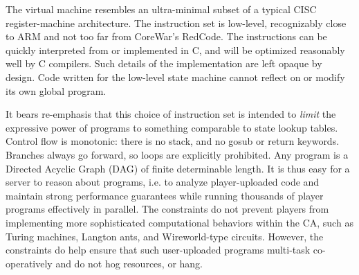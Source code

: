 \documentclass{acm_proc_article-sp}
\begin{document}
The virtual machine resembles an ultra-minimal subset of a typical CISC register-machine architecture.
The instruction set is low-level, recognizably close to ARM\cite{seal00} and not too far from CoreWar's RedCode\cite{CoreWarGuidelines84}.
The instructions can be quickly interpreted from or implemented in C, and will be optimized reasonably well by C compilers.
Such details of the implementation are left opaque by design.
Code written for the low-level state machine cannot reflect on or modify its own global program.
\begin{center}
\end{center}
It bears re-emphasis that this choice of instruction set is intended to {\em limit} the expressive power of programs
to something comparable to state lookup tables.
Control flow is monotonic: there is no stack, and no gosub or return keywords.
Branches always go forward, so loops are explicitly prohibited.
Any program is a Directed Acyclic Graph (DAG) of finite determinable length.
It is thus easy for a server to reason about programs,
i.e. to analyze player-uploaded code and maintain strong performance guarantees
while running thousands of player programs effectively in parallel.
The constraints do not prevent players from implementing
more sophisticated computational behaviors within the CA,
such as Turing machines, Langton ants, and Wireworld-type circuits.
However, the constraints do help ensure that such user-uploaded programs
multi-task co-operatively and do not hog resources, or hang.
\end{document}
